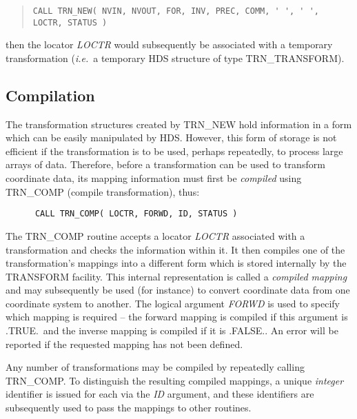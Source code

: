 \documentclass[twoside,11pt]{article}
\newcommand{\xlabel}[1]{}
\newcommand{\name}[1]{\mbox{\small{#1}}}
\newcommand{\fortvar}[1]{\mbox{\emph{#1}}}
\begin{document}
\begin{quote}\small
\begin{verbatim}
CALL TRN_NEW( NVIN, NVOUT, FOR, INV, PREC, COMM, ' ', ' ', LOCTR, STATUS )
\end{verbatim}
\end{quote}

then the locator \fortvar{LOCTR} would subsequently be associated with a
temporary transformation (\emph{i.e.}\ a temporary \name{HDS} structure of
type \name{TRN\_TRANSFORM}). 


\subsection{\xlabel{compilation}Compilation}

The transformation structures created by \name{TRN\_NEW} hold information in
a form which can be easily manipulated by \name{HDS}. 
However, this form of storage is not efficient if the transformation is to
be used, perhaps repeatedly, to process large arrays of data. 
Therefore, before a transformation can be used to transform coordinate data,
its mapping information must first be \emph{compiled} using \name{TRN\_COMP}
(compile transformation), thus:

\begin{verbatim}
      CALL TRN_COMP( LOCTR, FORWD, ID, STATUS )
\end{verbatim}

The \name{TRN\_COMP} routine accepts a locator \fortvar{LOCTR} associated
with a transformation and checks the information within it.
It then compiles one of the transformation's mappings into a different form
which is stored internally by the \name{TRANSFORM} facility. 
This internal representation is called a \emph{compiled mapping} and may
subsequently be used (for instance) to convert coordinate data from one
coordinate system to another. 
The logical argument \fortvar{FORWD} is used to specify which mapping is 
required -- the forward mapping is compiled if this argument is
\name{.TRUE.}\ and the inverse mapping is compiled if it is \name{.FALSE.}.
An error will be reported if the requested mapping has not been defined. 

Any number of transformations may be compiled by repeatedly calling
\name{TRN\_COMP}.
To distinguish the resulting compiled mappings, a unique \emph{integer}
identifier is issued for each via the \fortvar{ID} argument, and these
identifiers are subsequently used to pass the mappings to other routines. 
\end{document}
